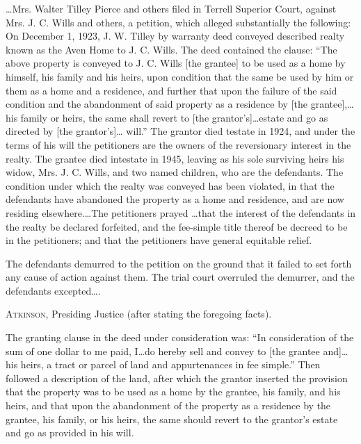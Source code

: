 
\dots Mrs. Walter Tilley Pierce and others filed in Terrell Superior Court,
against Mrs. J. C. Wills and others, a petition, which alleged substantially
the following: On December 1, 1923, J. W. Tilley by warranty deed conveyed
described realty known as the Aven Home to J. C. Wills. The deed contained the
clause: ``The above property is conveyed to J. C. Wills [the grantee] to be used
as a home by himself, his family and his heirs, upon condition that the same be
used by him or them as a home and a residence, and further that upon the
failure of the said condition and the abandonment of said property as a
residence by [the grantee],\dots his family or heirs, the same shall revert
to [the grantor's]\dots estate and go as directed by [the grantor's]\dots
will.'' The grantor died testate in 1924, and under the terms of his will the
petitioners are the owners of the reversionary interest in the realty. The
grantee died intestate in 1945, leaving as his sole surviving heirs his widow,
Mrs. J. C. Wills, and two named children, who are the defendants. The condition
under which the realty was conveyed has been violated, in that the defendants
have abandoned the property as a home and residence, and are now residing
elsewhere.\dots The petitioners prayed \dots that the interest of the
defendants in the realty be declared forfeited, and the fee-simple title
thereof be decreed to be in the petitioners; and that the petitioners have
general equitable relief.

The defendants demurred to the petition on the ground that it failed to set
forth any cause of action against them. The trial court overruled the demurrer,
and the defendants excepted\dots.

\opinion \textsc{Atkinson}, Presiding Justice (after stating the foregoing
facts).

The granting clause in the deed under consideration was: ``In consideration of
the sum of one dollar to me paid, I\dots do hereby sell and convey to [the
grantee and]\dots his heirs, a tract or parcel of land and appurtenances in
fee simple.'' Then followed a description of the land, after which the grantor
inserted the provision that the property was to be used as a home by the
grantee, his family, and his heirs, and that upon the abandonment of the
property as a residence by the grantee, his family, or his heirs, the same
should revert to the grantor's estate and go as provided in his will.

